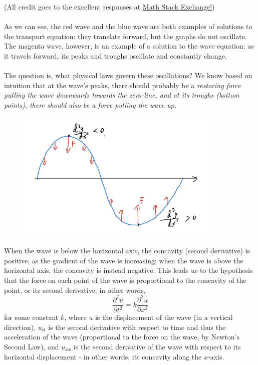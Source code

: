 \documentclass{article}
\begin{document}
(All credit goes to the excellent responses at \hyperlink{https://math.stackexchange.com/questions/1812922/help-visualizing-solutions-to-the-1d-wave-equation}{Math Stack Exchange!})
\\ \\
As we can see, the red wave and the blue wave are both examples of solutions to the transport equation: they translate forward, but the graphs do not oscillate. The magenta wave, however, is an example of a solution to the wave equation: as it travels forward, its peaks and troughs oscillate and constantly change. \\ \\
The question is, what physical laws govern these oscillations? We know based on intuition that at the wave's peaks, there should probably be a \it restoring force \normalfont pulling the wave downwards towards the zero-line, and at its troughs (bottom points), there should also be a force pulling the wave up.
\newpage
\begin{figure}[h]
    \centering
    \includegraphics[width=10cm]{DE-ch4-wave2.jpg}
\end{figure} 
When the wave is below the horizontal axis, the concavity (second derivative) is positive, as the gradient of the wave is increasing; when the wave is above the horizontal axis, the concavity is instead negative. This leads us to the hypothesis that the force on each point of the wave is proportional to the concavity of the point, or its second derivative; in other words, 
\begin{equation*}
    \frac{\partial^2 u}{\partial t^2} = k\frac{\partial^2 u}{\partial x^2}
\end{equation*}
for some constant $k$, where $u$ is the displacement of the wave (in a vertical direction), $u_{tt}$ is the second derivative with respect to time and thus the acceleration of the wave (proportional to the force on the wave, by Newton's Second Law), and $u_{xx}$ is the second derivative of the wave with respect to its horizontal displacement - in other words, its concavity along the $x$-axis.\\ \\ 
\end{document}
